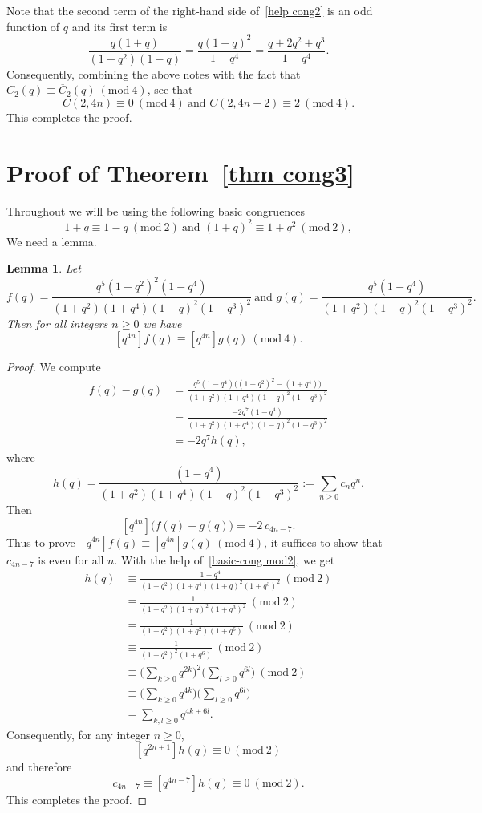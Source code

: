 \documentclass[reqno]{amsart}
\theoremstyle{definition}
\theoremstyle{plain}
\newtheorem{lemma}      {Lemma}
\theoremstyle{remark}
\numberwithin{equation}{section}
\newcommand{\Mod}[1]{\ (\mathrm{mod}\ #1)}
\newcommand{\fr}{\frac}
\begin{document}
Note that the second term of the right-hand side of~\eqref{help cong2} is an odd function of $q$ and its first term is
\[
\fr{q(1+q)}{(1+q^2)(1-q)} = \fr{q(1+q)^2}{1-q^4} = \fr{q+2q^2+q^3}{1-q^4}.
\]
Consequently, combining the above notes with the fact that $C_2(q)\equiv \overline{C}_2(q) \Mod{4}$, see that
\[
C(2,4n)\equiv 0\Mod{4}\ \text{and\ } C(2,4n+2)\equiv 2\Mod{4}.
\]
This completes the proof.
%
\section{Proof of Theorem~\ref{thm cong3}}\label{sec proof cong3}
Throughout we will be using the following basic congruences
\begin{equation}\label{basic-cong mod2}
1+q \equiv 1-q \Mod{2}\ \text{and\ }
(1+q)^2 \equiv 1+q^2\Mod{2},
\end{equation}
We need a lemma.
\begin{lemma}\label{lem cong3}
Let
\[
f(q)=\frac{q^5(1-q^2)^2(1-q^4)}{(1+q^2)(1+q^4)(1-q)^2(1-q^3)^2}\ \text{and\ }
g(q)=\frac{q^5(1-q^4)}{(1+q^2)(1-q)^2(1-q^3)^2}.
\]
Then for all integers $n\ge0$ we have
\[
[q^{4n}]f(q)\equiv [q^{4n}]g(q)\Mod{4}.
\]
\end{lemma}
%
\begin{proof}
We compute
\[
\begin{aligned}
f(q)-g(q)
&=\frac{q^5(1-q^4)\bigl((1-q^2)^2-(1+q^4)\bigr)}
        {(1+q^2)(1+q^4)(1-q)^2(1-q^3)^2} \\
&=\frac{-2q^7(1-q^4)}{(1+q^2)(1+q^4)(1-q)^2(1-q^3)^2} \\
&=-2q^7 h(q),
\end{aligned}
\]
where
\[
h(q)=\fr{(1-q^4)}{(1+q^2)(1+q^4)(1-q)^2(1-q^3)^2} := \sum_{n\ge0} c_n q^n.
\]
Then
\[
[q^{4n}]\big( f(q)-g(q) \big)=-2\,c_{4n-7}.
\]
Thus to prove $[q^{4n}]f(q)\equiv [q^{4n}]g(q)\Mod{4}$, it suffices to show that
$c_{4n-7}$ is even for all $n$.
With the help of~\eqref{basic-cong mod2}, we get
\begin{align*}
h(q) &\equiv \frac{1+q^4}{(1+q^2)(1+q^4)(1+q)^2(1+q^3)^2} \Mod{2} \\
&\equiv \frac{1}{(1+q^2)(1+q)^2(1+q^3)^2}\Mod{2} \\
&\equiv \frac{1}{(1+q^2)(1+q^2)(1+q^6)} \Mod{2}\\
&\equiv \frac{1}{(1+q^2)^2(1+q^6)}\Mod{2} \\
&\equiv \Big(\sum_{k\ge0} q^{2k}\Big)^2 \Big(\sum_{l\ge0} q^{6l}\Big) \Mod{2} \\
&\equiv \Big(\sum_{k\ge0} q^{4k}\Big)\Big(\sum_{l\ge0} q^{6l}\Big) \\
&=\sum_{k,l\geq 0} q^{4k+6l}.
\end{align*}
%
Consequently, for any integer $n\geq 0$,
\[
[q^{2n+1}]h(q)\equiv 0 \Mod{2}
\]
and therefore
\[
c_{4n-7} \equiv [q^{4n-7}]h(q)\equiv 0\Mod{2}.
\]
This completes the proof.
\end{proof}
\end{document}
